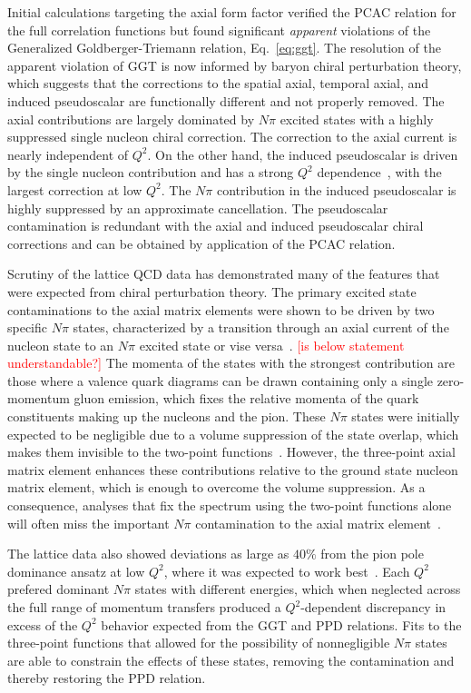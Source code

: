 Initial calculations targeting the axial form factor verified the PCAC relation
 for the full correlation functions but found significant \emph{apparent} violations
 of the Generalized Goldberger-Triemann relation, Eq.~\ref{eq:ggt}.
The resolution of the apparent violation of GGT
 is now informed by baryon chiral perturbation theory, which suggests that the
 corrections to the spatial axial, temporal axial, and induced pseudoscalar
 are functionally different and not properly removed.
The axial contributions are largely dominated by $N\pi$ excited states
 with a highly suppressed single nucleon chiral correction.
The correction to the axial current is nearly independent of $Q^2$.
On the other hand, the induced pseudoscalar is driven by the single nucleon contribution and has
 a strong $Q^2$ dependence~\cite{Bar:2018xyi}, with the largest correction at low $Q^2$.
The $N\pi$ contribution in the induced pseudoscalar is highly suppressed by
 an approximate cancellation.
The pseudoscalar contamination is redundant with the axial and induced pseudoscalar
 chiral corrections and can be obtained by application of the PCAC relation.

Scrutiny of the lattice QCD data has demonstrated many of the features
 that were expected from chiral perturbation theory.
The primary excited state contaminations to the axial matrix elements
 were shown to be driven by two specific $N\pi$ states,
 characterized by a transition through an axial current
 of the nucleon state to an $N\pi$ excited state or vise versa~\cite{Jang:2019vkm}.
\textcolor{red}{[is below statement understandable?]}
The momenta of the states with the strongest contribution are those
 where a valence quark diagrams can be drawn containing only a single
 zero-momentum gluon emission, which fixes the relative momenta of the
 quark constituents making up the nucleons and the pion.
These $N\pi$ states were initially expected to be negligible due to a volume suppression
 of the state overlap, which makes them invisible to the two-point functions~\cite{Bar:2016uoj}.
However, the three-point axial matrix element enhances these contributions relative
 to the ground state nucleon matrix element, which is enough to overcome the volume suppression.
As a consequence, analyses that fix the spectrum using the two-point functions alone
 will often miss the important $N\pi$ contamination to the
 axial matrix element~\cite{Jang:2019vkm,He:2021yvm}.

The lattice data also showed deviations as large as $40\%$ from the pion pole
 dominance ansatz at low $Q^2$, where it was expected to
 work best~\cite{Bali:2014nma,Gupta:2017dwj}.
Each $Q^2$ prefered dominant $N\pi$ states with different energies,
 which when neglected across the full range of momentum transfers
 produced a $Q^2$-dependent discrepancy in excess of the $Q^2$ behavior
 expected from the GGT and PPD relations.
Fits to the three-point functions that allowed for the possibility of
 nonnegligible $N\pi$ states are able to constrain the effects of these states,
 removing the contamination and thereby restoring the PPD relation.

